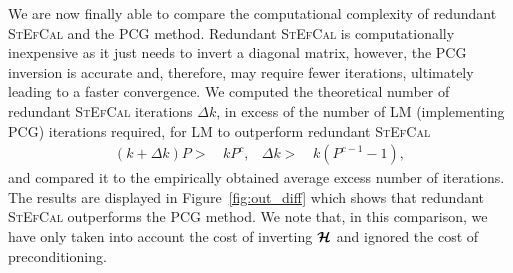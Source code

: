 \documentclass[useAMS,usenatbib]{mn2e}
\newcommand{\bmH}{\bmath{\mathcal{H}}}
\begin{document}
We are now finally able to compare the computational complexity of redundant \textsc{StEfCal} and the PCG method. Redundant \textsc{StEfCal} is computationally inexpensive as it just needs to invert a diagonal matrix, however, the PCG inversion is accurate and, therefore, may require fewer iterations, ultimately leading to a faster convergence. 
We computed the theoretical number of redundant \textsc{StEfCal} iterations $\Delta k$, in excess of the number of LM (implementing PCG) iterations required, for LM to outperform redundant \textsc{StEfCal}
\begin{align}
\label{eq:k} 
 (k+\Delta k)P >& \, kP^c, & \Delta k >& \, k(P^{c-1}-1),
\end{align}
and compared it to the empirically obtained average excess number of iterations. The results are displayed in Figure~\ref{fig:out_diff} which shows that redundant \textsc{StEfCal} outperforms the PCG method. We note that, in this comparison, we have only taken into account the cost of inverting $\bmH$ and ignored the cost of preconditioning. 
%
\end{document}
